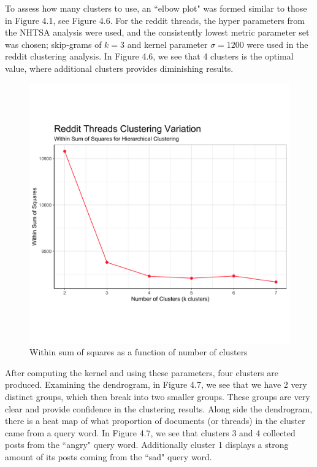 To assess how many clusters to use, an ``elbow plot" was formed similar to those in Figure 4.1, see Figure 4.6. For the reddit threads, the hyper parameters from the NHTSA analysis were used, and the consistently lowest metric parameter set was chosen; skip-grams of $k=3$ and kernel parameter $\sigma = 1200$ were used in the reddit clustering analysis. In Figure 4.6, we see that 4 clusters is the optimal value, where additional clusters provides diminishing results. \\

\newpage

\begin{figure}
\includegraphics[width=6in]{Content/Images/reddit_wss.png}
\caption{Within sum of squares as a function of number of clusters}
\end{figure}

After computing the kernel and using these parameters, four clusters are produced. Examining the dendrogram, in Figure 4.7, we see that we have 2 very distinct groups, which then break into two smaller groups. These groups are very clear and provide confidence in the clustering results. Along side the dendrogram, there is a heat map of what proportion of documents (or threads) in the cluster came from a query word. In Figure 4.7, we see that clusters 3 and 4 collected posts from the ``angry" query word. Additionally cluster 1 displays a strong amount of its posts coming from the ``sad" query word. \\

